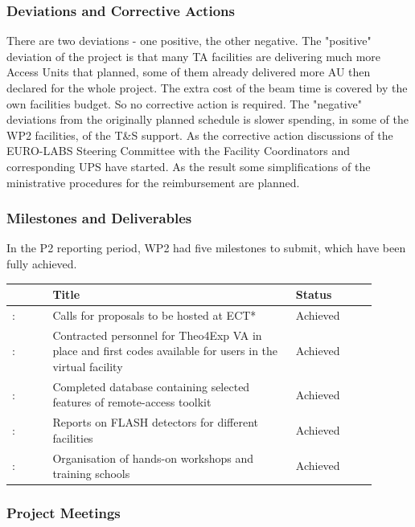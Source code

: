 \subsubsection*{Deviations and Corrective Actions}
There are two deviations - one positive, the other negative. The "positive" deviation of the project is that many TA facilities are delivering much more Access Units that planned, some of them already delivered more AU then declared for the whole project. The extra cost of the beam time is covered by the own facilities budget. So no corrective action is required.
The "negative" deviations from the originally planned schedule is slower spending, in some of the WP2 facilities, of the T\&S support. As the corrective action discussions of the EURO-LABS Steering Committee with the Facility Coordinators and corresponding UPS have started. As the result some simplifications of the ministrative procedures for the reimbursement are planned.  


\subsubsection*{Milestones and Deliverables}
In the P2 reporting period, WP2 had five milestones to submit, which have been fully achieved.
{\fontsize{9}{11}\selectfont
\begin{center}
  \begin{tabular}[t]{!{\color{mygray}\vrule}p{0.10\linewidth}!
  {\color{mygray}\vrule}p{0.60\linewidth}!
  {\color{mygray}\vrule}p{0.20\linewidth}!{\color{mygray}\vrule} } \hline
     & {\bf Title} & {\bf Status} \\ \hline
    : &Calls for proposals to be hosted at ECT*&  Achieved  \\ \hline
    : & Contracted personnel for Theo4Exp VA in place and first codes available for users in the virtual facility & Achieved \\ \hline    
    : & Completed database containing selected features of remote-access toolkit & Achieved \\ \hline 
    : & Reports on FLASH detectors for different facilities & Achieved \\ \hline 
    : & 	Organisation of hands-on workshops and training schools & Achieved \\ \hline 
  \end{tabular}
\end{center}
}

\subsubsection*{Project Meetings}










